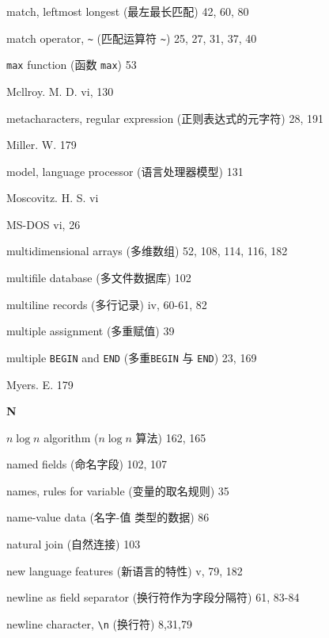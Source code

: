 \begin{multicols}{2}
\hangindent=2pc  match, leftmost longest (最左最长匹配) 42, 60, 80

\hangindent=2pc  match operator, \verb'~' (匹配运算符 \verb'~')
25, 27, 31, 37, 40

\hangindent=2pc  \verb'max' function (函数 \verb'max') 53

\hangindent=2pc  Mcllroy. M. D. vi, 130

\hangindent=2pc  metacharacters, regular expression
(正则表达式的元字符) 28, 191

\hangindent=2pc  Miller. W. 179

\hangindent=2pc  model, language processor (语言处理器模型) 131

\hangindent=2pc  Moscovitz. H. S. vi

\hangindent=2pc  MS-DOS vi, 26

\hangindent=2pc  multidimensional arrays (多维数组)
52, 108, 114, 116, 182

\hangindent=2pc  multifile database (多文件数据库) 102

\hangindent=2pc  multiline records (多行记录) iv, 60-61, 82

\hangindent=2pc  multiple assignment (多重赋值) 39

\hangindent=2pc  multiple \verb'BEGIN' and \verb'END' (多重\verb'BEGIN'
与 \verb'END') 23, 169

\hangindent=2pc  Myers. E. 179

\medskip\textbf{\large{N}}

\hangindent=2pc  $n \log n$ algorithm ($n \log n$ 算法) 162, 165

\hangindent=2pc  named fields (命名字段) 102, 107

\hangindent=2pc  names, rules for variable (变量的取名规则) 35

\hangindent=2pc  name-value data (\mbox{名字}-值 类型的数据) 86

\hangindent=2pc  natural join (自然连接) 103

\hangindent=2pc  new language features (新语言的特性) v, 79, 182

\hangindent=2pc  newline as field separator (换行符作为字段分隔符)
61,  83-84

\hangindent=2pc  newline character, \verb'\n' (换行符) 8,31,79


\end{multicols}
